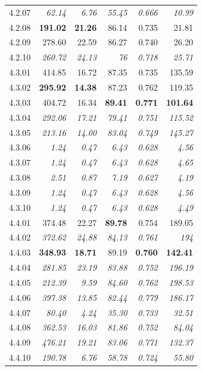 \begin{table}[!t]
\begin{tabular}{@{}lrrrrr@{}}
    4.2.07 & \textit{62.14} & \textit{6.76} & \textit{55.45} & \textit{0.666} & \textit{10.99} \\
    4.2.08 & \textbf{191.02} & \textbf{21.26} & 86.14 & 0.735 & 21.81 \\
    4.2.09 & 278.60 & 22.59 & 86.27 & 0.740 & 26.20 \\
    4.2.10 & \textit{260.72} & \textit{24.13} & \textit{76} & \textit{0.718} & \textit{25.71} \\
    \noalign{\smallskip}
    4.3.01 & 414.85 & 16.72 & 87.35 & 0.735 & 135.59 \\
    4.3.02 & \textbf{295.92} & \textbf{14.38} & 87.23 & 0.762 & 119.35 \\
    4.3.03 & 404.72 & 16.34 & \textbf{89.41} & \textbf{0.771} & \textbf{101.64} \\
    4.3.04 & \textit{292.06} & \textit{17.21} & \textit{79.41} & \textit{0.751} & \textit{115.52} \\
    4.3.05 & \textit{213.16} & \textit{14.00} & \textit{83.04} & \textit{0.749} & \textit{145.27} \\
    4.3.06 & \textit{1.24} & \textit{0.47} & \textit{6.43} & \textit{0.628} & \textit{4.56} \\
    4.3.07 & \textit{1.24} & \textit{0.47} & \textit{6.43} & \textit{0.628} & \textit{4.65} \\
    4.3.08 & \textit{2.51} & \textit{0.87} & \textit{7.19} & \textit{0.627} & \textit{4.19} \\
    4.3.09 & \textit{1.24} & \textit{0.47} & \textit{6.43} & \textit{0.628} & \textit{4.56} \\
    4.3.10 & \textit{1.24} & \textit{0.47} & \textit{6.43} & \textit{0.628} & \textit{4.49} \\
    \noalign{\smallskip}
    4.4.01 & 374.48 & 22.27 & \textbf{89.78} & 0.754 & 189.05 \\
    4.4.02 & \textit{372.62} & \textit{24.88} & \textit{84.13} & \textit{0.761} & \textit{194} \\
    4.4.03 & \textbf{348.93} & \textbf{18.71} & 89.19 & \textbf{0.760} & \textbf{142.41} \\
    4.4.04 & \textit{281.85} & \textit{23.19} & \textit{83.88} & \textit{0.752} & \textit{196.19} \\
    4.4.05 & \textit{212.39} & \textit{9.59} & \textit{84.60} & \textit{0.762} & \textit{198.53} \\
    4.4.06 & \textit{397.38} & \textit{13.85} & \textit{82.44} & \textit{0.779} & \textit{186.17} \\
    4.4.07 & \textit{80.40} & \textit{4.24} & \textit{35.30} & \textit{0.733} & \textit{32.51} \\
    4.4.08 & \textit{362.53} & \textit{16.03} & \textit{81.86} & \textit{0.752} & \textit{84.04} \\
    4.4.09 & \textit{476.21} & \textit{19.21} & \textit{83.06} & \textit{0.771} & \textit{132.37} \\
    4.4.10 & \textit{190.78} & \textit{6.76} & \textit{58.78} & \textit{0.724} & \textit{55.80} \\
\hline
\end{tabular}
\end{table}